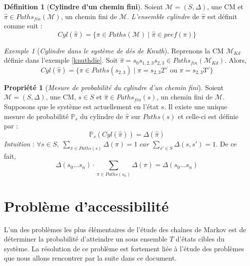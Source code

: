 \documentclass[12pt,a4paper]{report}
\theoremstyle{definition}%
\newtheorem{definition}{Définition}[chapter]
\newtheorem{propriete}{Propriété}[chapter]
\theoremstyle{remark}
\newtheorem{example}{Exemple}[chapter]
\newcommand{\pr}{\mathbb{P}}
\begin{document}
\begin{definition}[\textbf{Cylindre d'un chemin fini}]
	Soient $\mathcal{M} = (S, \Delta)$, une CM et $\hat{\pi} \in Paths_{fin}(\mathcal{M})$, un chemin fini de $\mathcal{M}$.  \textit{L'ensemble cylindre} de $\hat{\pi}$ est définit comme suit : 
	\[ Cyl(\hat{\pi}) = \{\pi \in Paths(\mathcal{M}) \; | \; \hat{\pi} \in pref(\pi) \}\]
\end{definition}

\begin{example}[\textit{Cylindre dans le système de dés de Knuth}]
	Reprenons la CM $\mathcal{M}_{Kd}$ définie dans l'exemple \ref{knuthdie}. Soit $\hat{\pi} = s_0s_{1, 2, 3}s_{2, 3} \in Paths_{fin}(\mathcal{M}_{Kd})$. Alors, \[Cyl(\hat{\pi}) = \{ \pi \in Paths(s_{2,3}) \; | \; \pi = s_{2, 3} 2^\omega \text{ ou } \pi = s_{2, 3} 3^\omega \} \]
\end{example}

\begin{propriete}[\textit{Mesure de probabilité du cylindre d'un chemin fini}]
	Soient $\mathcal{M} = (S, \Delta)$, une CM, $s \in S$ et $\hat{\pi} \in Paths_{fin}(s)$, un chemin fini de $\mathcal{M}$. Supposons que le système est actuellement en l'état $s$. Il existe une unique mesure de probabilité $\pr_s$ du cylindre de $\hat{\pi}$ sur $Paths(s)$ et celle-ci est définie par :
	\[\pr_{s}(Cyl(\hat{\pi})) = \Delta(\hat{\pi})\]
	\textit{Intuition} : $\forall s \in S, \; \sum_{\pi \in Paths(s)} \Delta(\pi) = 1 \textit{ car  } \sum_{s' \in S} \Delta(s, s') = 1 $. De ce fait, \[\Delta(s_0 \dots s_n) \cdot \sum_{\pi \in Paths(s_n)} \Delta(\pi) = \Delta(s_0 \dots s_n)\]
\end{propriete}

\section{Problème d'accessibilité}

L'un des problèmes les plus élémentaires de l'étude des chaînes de Markov est de déterminer la probabilité d'atteindre un sous ensemble $T$ d'états cibles du système. La résolution de ce problème est fortement liée à l'étude des problèmes que nous allons rencontrer par la suite dans ce document.
\end{document}
